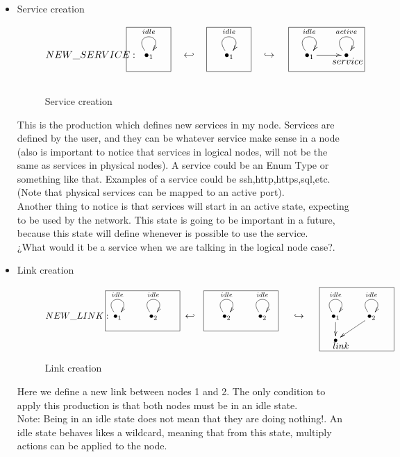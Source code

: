 \documentclass[envcountsect,runningheads]{llncs}
\begin{document}
\begin{itemize}
  \item Service creation
  \begin{figure}[H]
    \[
       \xymatrix@C=25pt@R=16pt
       {
         {\bullet}_{1} \ar@(ul,ur)^{idle}
         \POS[]-<5pc,0pc>\drop{NEW\_SERVICE:}
         \POS[]+<0pc,.5pc> *+=<3.8pc,3.8pc>[F-]{} 
         & {\hookleftarrow} &
         {\bullet}_{1} \ar@(ul,ur)^{idle}
         \POS[]+<0pc,.5pc> *+=<3.8pc,3.8pc>[F-]{} & {\hookrightarrow} &
         {\bullet}_{1} \ar@(ul,ur)^{idle}\ar@{->}[r]
         \POS[]+<1.5pc,.5pc> *+=<6.5pc,3.8pc>[F-]{} &
         {\bullet} \ar@(ul,ur)^{active}
         \POS[]-<-.1pc,.5pc>*+=<4pc,4pc>[]{}\drop{service}
       }
    \]
    \caption{Service creation}
    \protect\label{fig:servicecreation}
  \end{figure}
  This is the production which defines new services in my node. Services are 
  defined by the user, and they can be whatever service make sense in a node (also is important 
  to notice that services in logical nodes, will not be the same as services in physical 
  nodes). A service could be an Enum Type or something like that. Examples of 
  a service could be ssh,http,https,sql,etc. (Note that physical services can be mapped to an 
  active port). \\
  Another thing to notice is that services will start in an active state, 
  expecting to be used by the network. This state is going to be important in a 
  future, because this state will define whenever is possible to use the 
  service. \\
  ¿What would it be a service when we are talking in the logical node case?.\\
  
  \item Link creation
  \begin{figure}[H]
    \[
       \xymatrix@C=25pt@R=16pt
       {
        {\bullet}_{1}\ar@(ul,ur)^{idle} \POS[]-<3.8pc,0pc>\drop{NEW\_LINK:}
         \POS[]-<.4pc,-0.5pc> &
         {\bullet}_{2}\ar@(ul,ur)^{idle}
         \POS[]+<.4pc,0pc>
         \POS[]-<1pc,-0.5pc>*+=<7pc,3.8pc>[F-]{} & {\hookleftarrow} &
         {\bullet}_{2}\ar@(ul,ur)^{idle} 
         \POS[]-<.4pc,-0.5pc> &
         {\bullet}_{2}\ar@(ul,ur)^{idle}
         \POS[]+<.4pc,-0.5pc>
         \POS[]-<2pc,-0.5pc>*+=<7pc,3.8pc>[F-]{} & {\hookrightarrow} 
         \POS[]+<4.6pc,0.5pc> *+=<7pc,3.8pc>[]{} &
         {\bullet}_{1}\ar@(ul,ur)^{idle}\ar@{->}[d]
         \POS[]+<0pc,.5pc> &
         {\bullet}_{2} \ar@(ul,ur)^{idle}\ar@{->}[dl]
         \\
         & & & & & & {\bullet} \POS[]+<2pc,2pc>*+=<7pc,6pc>[F-]{} \POS[]-<-0.5pc,.5pc>\drop{link}
       }
    \]
    \caption{Link creation}
    \protect\label{fig:linkcreation}
  \end{figure}
  Here we define a new link between nodes 1 and 2. The only condition to apply 
  this production is that both nodes must be in an idle state.\\
  Note: Being in an idle state does not mean that they are doing nothing!. An 
  idle state behaves likes a wildcard, meaning that from this state, multiply actions 
  can be applied to the node.\\
  

\end{itemize}
\end{document}
